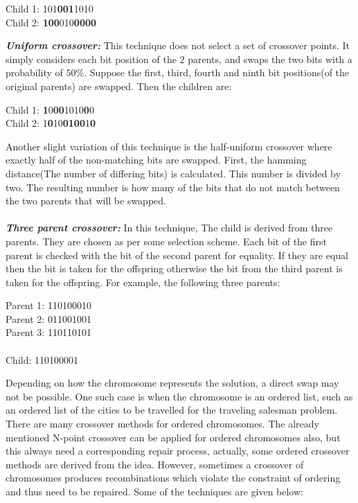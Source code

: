 \documentclass[a4paper, 12pt]{article}
\begin{document}
\begin{center}
Child 1: 101\textbf{001}1010\\
Child 2: \textbf{100}010\textbf{0000}
\end{center}
\textbf{\textit{Uniform crossover: }}
This technique does not select a set of crossover points. It simply considers each bit position of the $2$ parents, and swaps the two bits with
a probability of $50\%$. Suppose the first, third, fourth and ninth bit positions(of the original parents) are swapped. Then the children are:
\begin{center}
Child 1: \textbf{1}0\textbf{00}1010\textbf{0}0\\
Child 2: 1\textbf{0}10\textbf{0100}1\textbf{0}
\end{center}
Another slight variation of this technique is the half-uniform crossover where exactly half of the non-matching bits are swapped. First, the 
hamming distance(The number of differing bits) is calculated. This number is divided by two. The resulting number is how many of the bits
that do not match between the two parents that will be swapped.\\~\\
\textbf{\textit{Three parent crossover: }}
In this technique, The child is derived from three parents. They are chosen as per some selection scheme. Each bit of the first parent is
checked with the bit of the second parent for equality. If they are equal then the bit is taken for the offspring otherwise the bit from the
third parent is taken for the offspring. For example, the following three parents:
\begin{center}
Parent 1: 110100010\\
Parent 2: 011001001\\
Parent 3: 110110101\\~\\
Child: 110100001
\end{center}
Depending on how the chromosome represents the solution, a direct swap may not be possible. One such case is when the chromosome is an ordered list, such as an ordered list of the cities to be travelled for the traveling salesman problem. There are many crossover methods for ordered chromosomes. The already mentioned N-point crossover can be applied for ordered chromosomes also, but this always need a corresponding repair process, actually, some ordered crossover methods are derived from the idea. However, sometimes a crossover of chromosomes produces recombinations which violate the constraint of ordering and thus need to be repaired. Some of the techniques are given below:
\end{document}

